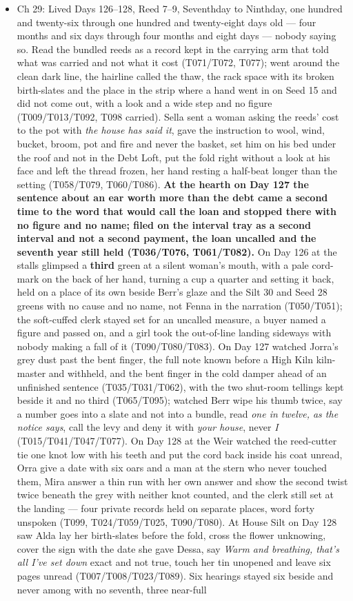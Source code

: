 \documentclass{design/chronicle}
\begin{document}
{\begin{itemize}[leftmargin=1.4em,itemsep=1pt,topsep=3pt,parsep=0pt]
\item Ch 29: Lived Days 126–128, Reed 7–9, Seventhday to Ninthday, one hundred and twenty-six through one hundred and twenty-eight days old — four months and six days through four months and eight days — nobody saying so. Read the bundled reeds as a record kept in the carrying arm that told what was carried and not what it cost (T071/T072, T077); went around the clean dark line, the hairline called the thaw, the rack space with its broken birth-slates and the place in the strip where a hand went in on Seed 15 and did not come out, with a look and a wide step and no figure (T009/T013/T092, T098 carried). Sella sent a woman asking the reeds’ cost to the pot with \emph{the house has said it}, gave the instruction to wool, wind, bucket, broom, pot and fire and never the basket, set him on his bed under the roof and not in the Debt Loft, put the fold right without a look at his face and left the thread frozen, her hand resting a half-beat longer than the setting (T058/T079, T060/T086). \textbf{At the hearth on Day 127 the sentence about an ear worth more than the debt came a second time to the word that would call the loan and stopped there with no figure and no name; filed on the interval tray as a second interval and not a second payment, the loan uncalled and the seventh year still held (T036/T076, T061/T082).} On Day 126 at the stalls glimpsed a \textbf{third} green at a silent woman’s mouth, with a pale cord-mark on the back of her hand, turning a cup a quarter and setting it back, held on a place of its own beside Berr’s glaze and the Silt 30 and Seed 28 greens with no cause and no name, not Fenna in the narration (T050/T051); the soft-cuffed clerk stayed set for an uncalled measure, a buyer named a figure and passed on, and a girl took the out-of-line landing sideways with nobody making a fall of it (T090/T080/T083). On Day 127 watched Jorra’s grey dust past the bent finger, the full note known before a High Kiln kiln-master and withheld, and the bent finger in the cold damper ahead of an unfinished sentence (T035/T031/T062), with the two shut-room tellings kept beside it and no third (T065/T095); watched Berr wipe his thumb twice, say a number goes into a slate and not into a bundle, read \emph{one in twelve, as the notice says}, call the levy and deny it with \emph{your house}, never \emph{I} (T015/T041/T047/T077). On Day 128 at the Weir watched the reed-cutter tie one knot low with his teeth and put the cord back inside his coat unread, Orra give a date with six oars and a man at the stern who never touched them, Mira answer a thin run with her own answer and show the second twist twice beneath the grey with neither knot counted, and the clerk still set at the landing — four private records held on separate places, word forty unspoken (T099, T024/T059/T025, T090/T080). At House Silt on Day 128 saw Alda lay her birth-slates before the fold, cross the flower unknowing, cover the sign with the date she gave Dessa, say \emph{Warm and breathing, that’s all I’ve set down} exact and not true, touch her tin unopened and leave six pages unread (T007/T008/T023/T089). Six hearings stayed six beside and never among with no seventh, three near-full 
\end{itemize}}
\end{document}
